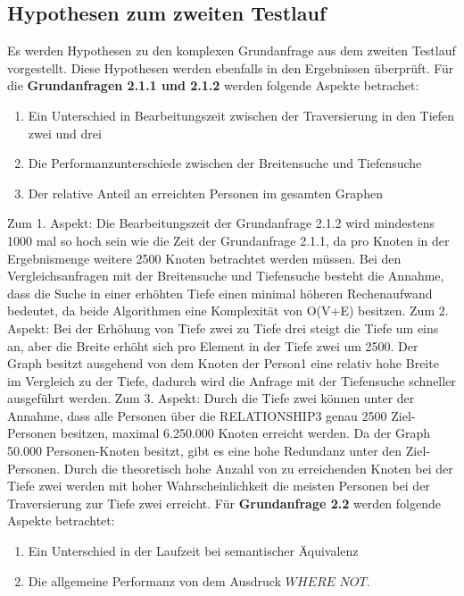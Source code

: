 \subsection{Hypothesen zum zweiten Testlauf}
Es werden Hypothesen zu den komplexen Grundanfrage aus dem zweiten Testlauf vorgestellt. Diese Hypothesen werden ebenfalls in den Ergebnissen überprüft.\newline \newline
Für die \textbf{Grundanfragen 2.1.1 und 2.1.2} werden folgende Aspekte betrachet: 
\begin{enumerate}
	\item Ein Unterschied in Bearbeitungszeit zwischen der Traversierung in den Tiefen zwei und drei 
	\item Die Performanzunterschiede zwischen der Breitensuche und Tiefensuche
	\item Der relative Anteil an erreichten Personen im gesamten Graphen
\end{enumerate}
Zum 1. Aspekt: Die Bearbeitungszeit der Grundanfrage 2.1.2 wird mindestens 1000 mal so hoch sein wie die Zeit der Grundanfrage 2.1.1, da pro Knoten in der Ergebnismenge weitere 2500 Knoten betrachtet werden müssen. Bei den Vergleichsanfragen mit der  Breitensuche und Tiefensuche besteht die Annahme, dass die Suche in einer erhöhten Tiefe einen minimal höheren Rechenaufwand bedeutet, da beide Algorithmen eine Komplexität von O(V+E) besitzen. \newline
Zum 2. Aspekt: Bei der Erhöhung von Tiefe zwei zu Tiefe drei steigt die Tiefe um eins an, aber die Breite erhöht sich pro Element in der Tiefe zwei um 2500. Der Graph besitzt ausgehend von dem Knoten der Person1 eine relativ hohe Breite im Vergleich zu der Tiefe, dadurch wird die Anfrage mit der Tiefensuche  schneller ausgeführt werden. \newline
Zum 3. Aspekt: Durch die Tiefe zwei können unter der Annahme, dass alle Personen über die RELATIONSHIP3 genau 2500 Ziel-Personen besitzen, maximal 6.250.000 Knoten erreicht werden. Da der Graph 50.000 Personen-Knoten besitzt, gibt es eine hohe Redundanz unter den Ziel-Personen. Durch die theoretisch hohe Anzahl von zu erreichenden Knoten bei der Tiefe zwei werden mit hoher Wahrscheinlichkeit die meisten Personen bei der Traversierung zur Tiefe zwei erreicht. \newline \newline
Für \textbf{Grundanfrage 2.2} werden folgende Aspekte betrachtet: 
\begin{enumerate}
	\item Ein Unterschied in der Laufzeit bei  semantischer Äquivalenz  
	\item Die allgemeine Performanz von dem Ausdruck $WHERE$ $NOT$.
\end{enumerate}
